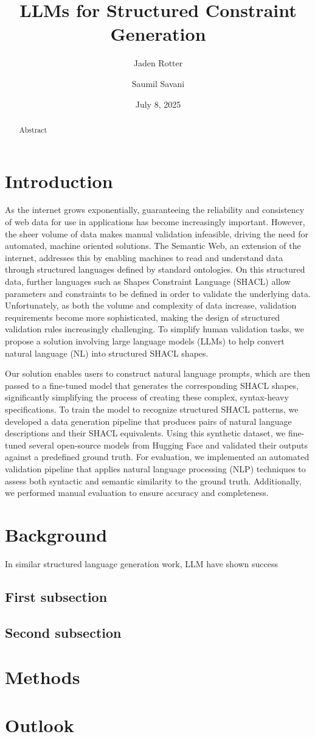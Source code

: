 \documentclass[
  english,        %
  font=times,     %
  twocolumn,      %
]{tumarticle}
\title{LLMs for Structured Constraint Generation}
\author[email=jaden.rotter@tum.de]{Jaden Rotter}
\author[email=saumil.savani@tum.de]{Saumil Savani}
\date{July 8, 2025}
\begin{document}
\maketitle

\begin{abstract}
Abstract
\end{abstract}

\section{Introduction}
As the internet grows exponentially, guaranteeing the reliability and consistency of web data for use in applications has become increasingly important. 
However, the sheer volume of data makes manual validation infeasible, driving the need for automated, machine oriented solutions. 
The Semantic Web, an extension of the internet, addresses this by enabling machines to read and understand data through structured languages defined by standard ontologies. 
On this structured data, further languages such as Shapes Constraint Language (SHACL) allow parameters and constraints to be defined in order to validate the underlying data. 
Unfortunately, as both the volume and complexity of data increase, validation requirements become more sophisticated, making the design of structured validation rules increasingly challenging.
To simplify human validation tasks, we propose a solution involving large language models (LLMs) to help convert natural language (NL) into structured SHACL shapes. 


Our solution enables users to construct natural language prompts, which are then passed to a fine-tuned model that generates the corresponding SHACL shapes, significantly simplifying the process of creating these complex, syntax-heavy specifications. 
To train the model to recognize structured SHACL patterns, we developed a data generation pipeline that produces pairs of natural language descriptions and their SHACL equivalents. 
Using this synthetic dataset, we fine-tuned several open-source models from Hugging Face and validated their outputs against a predefined ground truth.
For evaluation, we implemented an automated validation pipeline that applies natural language processing (NLP) techniques to assess both syntactic and semantic similarity to the ground truth. 
Additionally, we performed manual evaluation to ensure accuracy and completeness.


\section{Background}
In similar structured language generation work, LLM have shown success 

\subsection{First subsection}
\lipsum[2]
\subsection{Second subsection}
\lipsum[3]

\section{Methods}
\lipsum[4-5]

\section{Outlook}
\lipsum[6]
\end{document}
